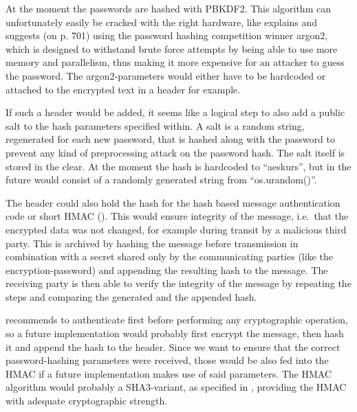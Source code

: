 At the moment the passwords are hashed with PBKDF2. This algorithm can
unfortunately easily be cracked with the right hardware, like \cite[p. 697]{appcrypt} explains and suggests (on p. 701) using the password hashing
competition winner argon2, which is designed to withstand brute force
attempts by being able to use more memory and parallelism, thus making it
more expensive for an attacker to guess the password. The
argon2-parameters would either have to be hardcoded or attached to the
encrypted text in a header for example.

If such a header would be added, it seems like a logical step to also
add a public salt to the hash parameters specified within. A salt is a
random string, regenerated for each new password, that is hashed along
with the password to prevent any kind of preprocessing attack on the
password hash. The salt itself is stored in the clear. \cite[p. 693]{appcrypt} At
the moment the hash is hardcoded to ``aeskurs'', but in the future would
consist of a randomly generated string from ``os.urandom()''.

The header could also hold the hash for the hash based message
authentication code or short HMAC (\cite[ch. 12.2.3]{paar}). This would ensure
integrity of the message, i.e.~that the encrypted data was not changed,
for example during transit by a malicious third party. This is archived
by hashing the message before transmission in combination with a secret
shared only by the communicating parties (like the encryption-password)
and appending the resulting hash to the message. The receiving party is
then able to verify the integrity of the message by repeating the steps
and comparing the generated and the appended hash.

\cite{moxie} recommends to authenticate first before performing any
cryptographic operation, so a future implementation would probably first
encrypt the message, then hash it and append the hash to the header.
Since we want to ensure that the correct password-hashing parameters
were received, those would be also fed into the HMAC if a future
implementation makes use of said parameters. The HMAC algorithm would
probably a SHA3-variant, as specified in \cite{fips202}, providing the HMAC
with adequate cryptographic strength.
